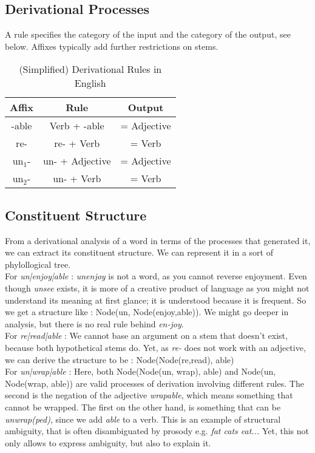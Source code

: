 \documentclass{cours}
\begin{document}
\subsection{Derivational Processes}
A rule specifies the category of the input and the category of the output, see below. Affixes typically add further restrictions on stems.

\begin{table}
    \centering
    \caption{(Simplified) Derivational Rules in English}
    \begin{tabular}{ccc}
        \toprule
        Affix &Rule &Output\\
        \midrule
        -able & Verb + -able &= Adjective\\
        re- & re- + Verb &= Verb\\
        un$_{1}$- & un- + Adjective &= Adjective\\
        un$_{2}$- & un- + Verb &= Verb\\
    \end{tabular}
\end{table}

\subsection{Constituent Structure}
From a derivational analysis of a word in terms of the processes that generated it, we can extract its constituent structure. We can represent it in a sort of phylollogical tree. \\
For \textsl{un|enjoy|able} : \textsl{unenjoy} is not a word, as you cannot reverse enjoyment. Even though \textsl{unsee} exists, it is more of a creative product of language as you might not understand its meaning at first glance; it is understood because it is frequent. So we get a structure like : Node(un, Node(enjoy,able)). We might go deeper in analysis, but there is no real rule behind \textsl{en-joy}.\\
For \textsl{re|read|able} : We cannot base an argument on a stem that doesn't exist, because both hypothetical stems do. Yet, as \textsl{re-} does not work with an adjective, we can derive the structure to be : Node(Node(re,read), able)\\
For \textsl{un|wrap|able} : Here, both Node(Node(un, wrap), able) and Node(un, Node(wrap, able)) are valid processes of derivation involving different rules. The second is the negation of the adjective \textsl{wrapable}, which means something that cannot be wrapped. The first on the other hand, is something that can be \textsl{unwrap(ped)}, since we add \textsl{able} to a verb. This is an example of structural ambiguity, that is often disambiguated by prosody e.g. \textsl{fat cats eat...} Yet, this not only allows to express ambiguity, but also to explain it. 
\end{document}
